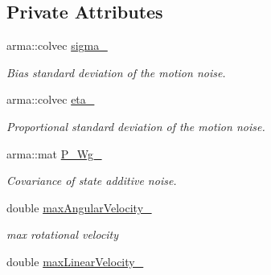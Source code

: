 \subsection*{\-Private \-Attributes}
\begin{DoxyCompactItemize}
\item 
\hypertarget{class_unicycle_motion_model_a8d47c96b281d68b16bfed5c6019b7502}{arma\-::colvec \hyperlink{class_unicycle_motion_model_a8d47c96b281d68b16bfed5c6019b7502}{sigma\-\_\-}}\label{class_unicycle_motion_model_a8d47c96b281d68b16bfed5c6019b7502}

\begin{DoxyCompactList}\small\item\em \-Bias standard deviation of the motion noise. \end{DoxyCompactList}\item 
\hypertarget{class_unicycle_motion_model_a4025caf061ba4e6426af86ae7074b7a9}{arma\-::colvec \hyperlink{class_unicycle_motion_model_a4025caf061ba4e6426af86ae7074b7a9}{eta\-\_\-}}\label{class_unicycle_motion_model_a4025caf061ba4e6426af86ae7074b7a9}

\begin{DoxyCompactList}\small\item\em \-Proportional standard deviation of the motion noise. \end{DoxyCompactList}\item 
\hypertarget{class_unicycle_motion_model_aa23aec795c0d97c5c54db925cfa27426}{arma\-::mat \hyperlink{class_unicycle_motion_model_aa23aec795c0d97c5c54db925cfa27426}{\-P\-\_\-\-Wg\-\_\-}}\label{class_unicycle_motion_model_aa23aec795c0d97c5c54db925cfa27426}

\begin{DoxyCompactList}\small\item\em \-Covariance of state additive noise. \end{DoxyCompactList}\item 
\hypertarget{class_unicycle_motion_model_a64f132a45af955098864992fd06e6bf0}{double \hyperlink{class_unicycle_motion_model_a64f132a45af955098864992fd06e6bf0}{max\-Angular\-Velocity\-\_\-}}\label{class_unicycle_motion_model_a64f132a45af955098864992fd06e6bf0}

\begin{DoxyCompactList}\small\item\em max rotational velocity \end{DoxyCompactList}\item 
\hypertarget{class_unicycle_motion_model_aaa92675e5a2f14a45ba08b6e008fd0b0}{double \hyperlink{class_unicycle_motion_model_aaa92675e5a2f14a45ba08b6e008fd0b0}{max\-Linear\-Velocity\-\_\-}}\label{class_unicycle_motion_model_aaa92675e5a2f14a45ba08b6e008fd0b0}


\end{DoxyCompactItemize}
